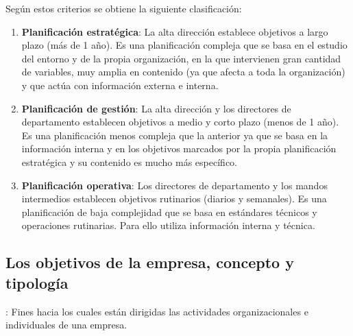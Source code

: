 \documentclass[12pt]{article}
\theoremstyle{definition_wo_parentheses}
\begin{document}
Según estos criterios se obtiene la siguiente clasificación:
\begin{enumerate}
\item \textbf{Planificación estratégica}: La alta dirección establece objetivos a largo plazo (más de 1 año). Es una planificación compleja que se basa en el estudio del entorno y de la propia organización, en la que intervienen gran cantidad de variables, muy amplia en contenido (ya que afecta a toda la organización) y que actúa con información externa e interna.
\item \textbf{Planificación de gestión}: La alta dirección y los directores de departamento establecen objetivos a medio y corto plazo (menos de 1 año). Es una planificación menos compleja que la anterior ya que se basa en la información interna y en los objetivos marcados por la propia planificación estratégica y su contenido es mucho más específico.
\item \textbf{Planificación operativa}: Los directores de departamento y los mandos intermedios establecen objetivos rutinarios (diarios y semanales). Es una planificación de baja complejidad que se basa en estándares técnicos y operaciones rutinarias. Para ello utiliza información interna y técnica.
\end{enumerate}

\subsection{Los objetivos de la empresa, concepto y tipología}
: Fines hacia los cuales están dirigidas las actividades organizacionales e individuales de una empresa.\\
\end{document}
